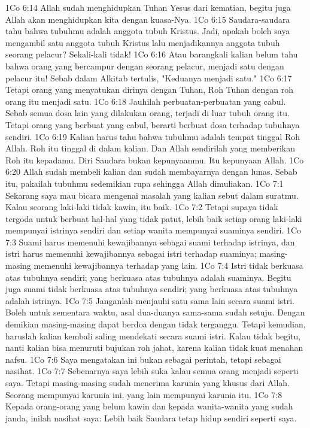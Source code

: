 1Co 6:14  Allah sudah menghidupkan Tuhan Yesus dari kematian, begitu juga Allah akan menghidupkan kita dengan kuasa-Nya.
1Co 6:15  Saudara-saudara tahu bahwa tubuhmu adalah anggota tubuh Kristus. Jadi, apakah boleh saya mengambil satu anggota tubuh Kristus lalu menjadikannya anggota tubuh seorang pelacur? Sekali-kali tidak!
1Co 6:16  Atau barangkali kalian belum tahu bahwa orang yang bercampur dengan seorang pelacur, menjadi satu dengan pelacur itu! Sebab dalam Alkitab tertulis, "Keduanya menjadi satu."
1Co 6:17  Tetapi orang yang menyatukan dirinya dengan Tuhan, Roh Tuhan dengan roh orang itu menjadi satu.
1Co 6:18  Jauhilah perbuatan-perbuatan yang cabul. Sebab semua dosa lain yang dilakukan orang, terjadi di luar tubuh orang itu. Tetapi orang yang berbuat yang cabul, berarti berbuat dosa terhadap tubuhnya sendiri.
1Co 6:19  Kalian harus tahu bahwa tubuhmu adalah tempat tinggal Roh Allah. Roh itu tinggal di dalam kalian. Dan Allah sendirilah yang memberikan Roh itu kepadamu. Diri Saudara bukan kepunyaanmu. Itu kepunyaan Allah.
1Co 6:20  Allah sudah membeli kalian dan sudah membayarnya dengan lunas. Sebab itu, pakailah tubuhmu sedemikian rupa sehingga Allah dimuliakan.
1Co 7:1  Sekarang saya mau bicara mengenai masalah yang kalian sebut dalam suratmu. Kalau seorang laki-laki tidak kawin, itu baik.
1Co 7:2  Tetapi supaya tidak tergoda untuk berbuat hal-hal yang tidak patut, lebih baik setiap orang laki-laki mempunyai istrinya sendiri dan setiap wanita mempunyai suaminya sendiri.
1Co 7:3  Suami harus memenuhi kewajibannya sebagai suami terhadap istrinya, dan istri harus memenuhi kewajibannya sebagai istri terhadap suaminya; masing-masing memenuhi kewajibannya terhadap yang lain.
1Co 7:4  Istri tidak berkuasa atas tubuhnya sendiri; yang berkuasa atas tubuhnya adalah suaminya. Begitu juga suami tidak berkuasa atas tubuhnya sendiri; yang berkuasa atas tubuhnya adalah istrinya.
1Co 7:5  Janganlah menjauhi satu sama lain secara suami istri. Boleh untuk sementara waktu, asal dua-duanya sama-sama sudah setuju. Dengan demikian masing-masing dapat berdoa dengan tidak terganggu. Tetapi kemudian, haruslah kalian kembali saling mendekati secara suami istri. Kalau tidak begitu, nanti kalian bisa menuruti bujukan roh jahat, karena kalian tidak kuat menahan nafsu.
1Co 7:6  Saya mengatakan ini bukan sebagai perintah, tetapi sebagai nasihat.
1Co 7:7  Sebenarnya saya lebih suka kalau semua orang menjadi seperti saya. Tetapi masing-masing sudah menerima karunia yang khusus dari Allah. Seorang mempunyai karunia ini, yang lain mempunyai karunia itu.
1Co 7:8  Kepada orang-orang yang belum kawin dan kepada wanita-wanita yang sudah janda, inilah nasihat saya: Lebih baik Saudara tetap hidup sendiri seperti saya.
